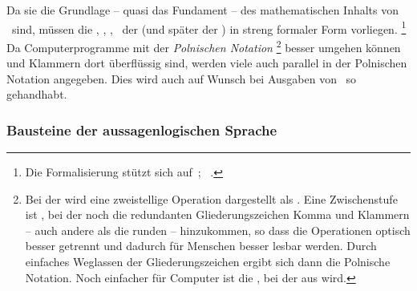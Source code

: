 Da sie die Grundlage -- quasi das Fundament -- des mathematischen Inhalts von \ASBA\ sind, müssen die \Axiome, \Saetze, \Beweise, \textusw\ der  (und später der ) in streng formaler Form vorliegen.%
\footnote{%
	Die Formalisierung stützt sich auf~\cite{bib:Aussagenlogik}; \alsoname~\cite{bib:LogikDe, bib:LogikEn}.
}
Da Computerprogramme mit der \emph{Polnischen Notation}%
\footnote{%
	Bei der  wird eine zweistellige Operation  dargestellt als .
	Eine Zwischenstufe ist , bei der noch die redundanten Gliederungszeichen Komma und Klammern -- auch andere als die runden -- hinzukommen, so dass die Operationen optisch besser getrennt und dadurch für Menschen besser lesbar werden.
	Durch einfaches Weglassen der Gliederungszeichen ergibt sich dann die Polnische Notation.
	Noch einfacher für Computer ist die , bei der aus   wird.
}
besser umgehen können und Klammern dort überflüssig sind, werden viele  auch parallel in der Polnischen Notation angegeben.
Dies wird auch auf Wunsch bei Ausgaben von \ASBA\ so gehandhabt.

\subsubsection{Bausteine der aussagenlogischen Sprache}%
\label{subsub:Bausteine}

